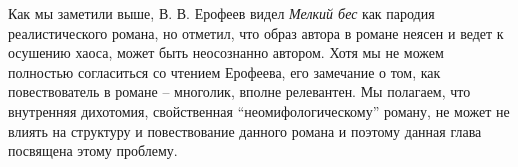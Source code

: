 \documentclass[12pt,a4paper]{article}
\begin{document}
Как мы заметили выше, В. В. Ерофеев видел \emph{Мелкий бес} как пародия реалистического романа, но отметил, что образ автора в романе неясен и ведет к осушению хаоса, может быть неосознанно автором. Хотя мы не можем полностью согласиться со чтением Ерофеева, его замечание о том, как повествователь в романе – многолик, вполне релевантен. Мы полагаем, что внутренняя дихотомия, свойственная \enquote{неомифологическому} роману, не может не влиять на структуру и повествование данного романа и поэтому данная глава посвящена этому проблему.


%



\end{document}
